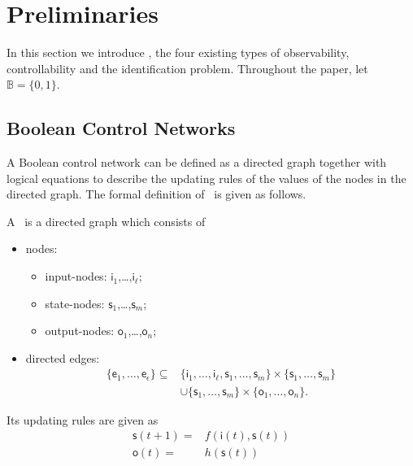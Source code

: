
\section{Preliminaries} 
\label{sec:pre}
In this section we introduce {\BCNs}, the four existing types of observability, controllability and the identification problem. Throughout the paper,  let $\mathbb{B}=\{0,1\}$.

\subsection{Boolean Control Networks}

A Boolean control network can be defined as a directed graph together with logical equations to describe the updating rules of the values of the nodes in  the directed graph. The formal definition of \BCN\ is given as follows. 

\begin{definition} A \BCN\
	is a directed graph which consists of 
	\begin{itemize}
	\item nodes:
	\begin{itemize}
	\item input-nodes: {$\mathsf{i}_1$,\ldots ,$\mathsf{i}_{\ell}$};  
	\item state-nodes: {$\mathsf{s}_1$,\ldots ,$\mathsf{s}_m$};
	\item output-nodes: {$\mathsf{o}_1$,\ldots ,$\mathsf{o}_n$};
	\end{itemize}	
	\item  directed edges: 
		\begin{equation*}
			\begin{split}
				\{\mathsf{e}_1,\ldots,\mathsf{e}_{\epsilon}\}\subseteq & \{\mathsf{i}_1,\ldots ,\mathsf{i}_{\ell},\mathsf{s}_1,\ldots ,\mathsf{s}_m\}\times \{\mathsf{s}_1,\ldots ,\mathsf{s}_m\} \\
				&\cup \{\mathsf{s}_1,\ldots ,\mathsf{s}_m\}\times\{\mathsf{o}_1,\ldots ,\mathsf{o}_n\}. 
			\end{split}
		\end{equation*}
	
\end{itemize}	
Its updating rules are given as
\begin{equation}
\begin{split}
\mathsf{s}(t+1)=&f(\mathsf{i}(t),\mathsf{s}(t))\\
\mathsf{o}(t)=&h(\mathsf{s}(t))
\end{split}
\label{equ:1}
\end{equation}
 \end{definition}

